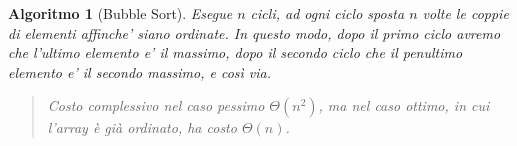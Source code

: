 \documentclass[oneside]{book}
\newtheorem{alg}{Algoritmo}
\begin{document}
\begin{alg}[Bubble Sort]
  Esegue $n$ cicli, ad ogni ciclo sposta $n$ volte le coppie di elementi affinche'
  siano ordinate. In questo modo, dopo il primo ciclo avremo che l'ultimo elemento
  e' il massimo, dopo il secondo ciclo che il penultimo elemento e' il secondo massimo,
  e cos\`i via.

  \begin{algorithm}[H]

  \end{algorithm}
  \begin{quote}
    Costo complessivo nel caso pessimo $\Theta(n^2)$, ma nel caso ottimo, in cui
    l'array \`e gi\`a ordinato, ha costo $\Theta(n)$.
  \end{quote}
\end{alg}

\pagebreak
\end{document}
